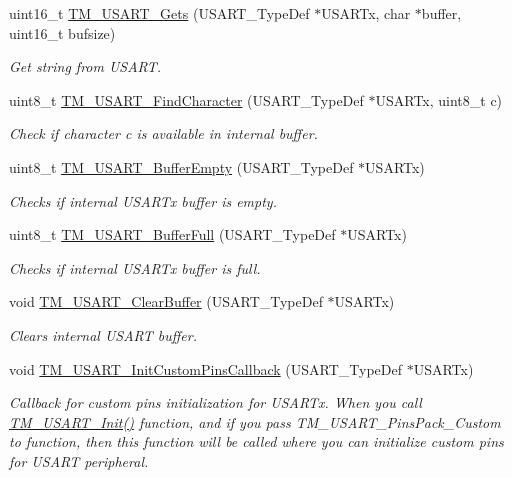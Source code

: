 \begin{DoxyCompactItemize}
uint16\+\_\+t \hyperlink{group___t_m___u_s_a_r_t___functions_gabb0a95fd20e5e2a894e658b64a29ee61}{T\+M\+\_\+\+U\+S\+A\+R\+T\+\_\+\+Gets} (U\+S\+A\+R\+T\+\_\+\+Type\+Def $\ast$U\+S\+A\+R\+Tx, char $\ast$buffer, uint16\+\_\+t bufsize)
\begin{DoxyCompactList}\small\item\em Get string from U\+S\+A\+R\+T. \end{DoxyCompactList}\item 
uint8\+\_\+t \hyperlink{group___t_m___u_s_a_r_t___functions_ga5f708a330c9fc45032143a5777d9b6fd}{T\+M\+\_\+\+U\+S\+A\+R\+T\+\_\+\+Find\+Character} (U\+S\+A\+R\+T\+\_\+\+Type\+Def $\ast$U\+S\+A\+R\+Tx, uint8\+\_\+t c)
\begin{DoxyCompactList}\small\item\em Check if character c is available in internal buffer. \end{DoxyCompactList}\item 
uint8\+\_\+t \hyperlink{group___t_m___u_s_a_r_t___functions_gabcee39f90c8c33ff3b1fb07e6496eef6}{T\+M\+\_\+\+U\+S\+A\+R\+T\+\_\+\+Buffer\+Empty} (U\+S\+A\+R\+T\+\_\+\+Type\+Def $\ast$U\+S\+A\+R\+Tx)
\begin{DoxyCompactList}\small\item\em Checks if internal U\+S\+A\+R\+Tx buffer is empty. \end{DoxyCompactList}\item 
uint8\+\_\+t \hyperlink{group___t_m___u_s_a_r_t___functions_ga0bf136abba24771c4a5a83ace52a76c1}{T\+M\+\_\+\+U\+S\+A\+R\+T\+\_\+\+Buffer\+Full} (U\+S\+A\+R\+T\+\_\+\+Type\+Def $\ast$U\+S\+A\+R\+Tx)
\begin{DoxyCompactList}\small\item\em Checks if internal U\+S\+A\+R\+Tx buffer is full. \end{DoxyCompactList}\item 
void \hyperlink{group___t_m___u_s_a_r_t___functions_ga6c8dfcc950305f511393240ea847b2ad}{T\+M\+\_\+\+U\+S\+A\+R\+T\+\_\+\+Clear\+Buffer} (U\+S\+A\+R\+T\+\_\+\+Type\+Def $\ast$U\+S\+A\+R\+Tx)
\begin{DoxyCompactList}\small\item\em Clears internal U\+S\+A\+R\+T buffer. \end{DoxyCompactList}\item 
void \hyperlink{group___t_m___u_s_a_r_t___functions_ga299f46d68e55bc8e5054ac3eef9e39ee}{T\+M\+\_\+\+U\+S\+A\+R\+T\+\_\+\+Init\+Custom\+Pins\+Callback} (U\+S\+A\+R\+T\+\_\+\+Type\+Def $\ast$U\+S\+A\+R\+Tx)
\begin{DoxyCompactList}\small\item\em Callback for custom pins initialization for U\+S\+A\+R\+Tx. When you call \hyperlink{group___t_m___u_s_a_r_t___functions_ga70bed9fb6612cb572a8c10e148404344}{T\+M\+\_\+\+U\+S\+A\+R\+T\+\_\+\+Init()} function, and if you pass T\+M\+\_\+\+U\+S\+A\+R\+T\+\_\+\+Pins\+Pack\+\_\+\+Custom to function, then this function will be called where you can initialize custom pins for U\+S\+A\+R\+T peripheral. \end{DoxyCompactList}\item 

\end{DoxyCompactItemize}
